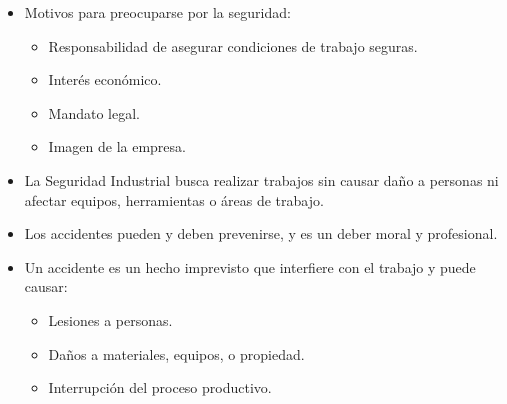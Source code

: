 \documentclass{article} %
\begin{document}
\begin{itemize}[label={},left=0pt,align=parleft]
    \item \begin{highlightbox}[levelone] Motivos para preocuparse por la seguridad: \end{highlightbox}
    \begin{itemize}[label={},left=1em,align=parleft]
        \item \begin{highlightbox}[leveltwo] Responsabilidad de asegurar condiciones de trabajo seguras. \end{highlightbox}
        \item \begin{highlightbox}[leveltwo] Interés económico. \end{highlightbox}
        \item \begin{highlightbox}[leveltwo] Mandato legal. \end{highlightbox}
        \item \begin{highlightbox}[leveltwo] Imagen de la empresa. \end{highlightbox}
    \end{itemize}
    \item \begin{highlightbox}[levelone] La Seguridad Industrial busca realizar trabajos sin causar daño a personas ni afectar equipos, herramientas o áreas de trabajo. \end{highlightbox}
    \item \begin{highlightbox}[levelone] Los accidentes pueden y deben prevenirse, y es un deber moral y profesional. \end{highlightbox}
    \item \begin{highlightbox}[levelone] Un accidente es un hecho imprevisto que interfiere con el trabajo y puede causar: \end{highlightbox}
    \begin{itemize}[label={},left=1em,align=parleft]
        \item \begin{highlightbox}[leveltwo] Lesiones a personas. \end{highlightbox}
        \item \begin{highlightbox}[leveltwo] Daños a materiales, equipos, o propiedad. \end{highlightbox}
        \item \begin{highlightbox}[leveltwo] Interrupción del proceso productivo. \end{highlightbox}
    \end{itemize}
\end{itemize}
\end{document}
